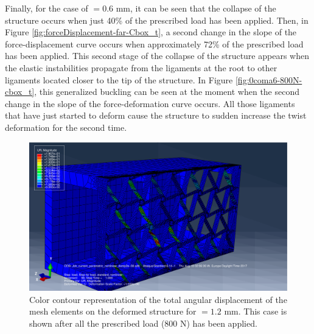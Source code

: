     Finally, for the case of \boxt$= 0.6$ mm, it can be seen that the collapse of the structure occurs when just 40\% of the prescribed load has been applied. Then, in Figure \ref{fig:forceDisplacement-far-Cbox_t}, a second change in the slope of the force-displacement curve occurs when approximately 72\% of the prescribed load has been applied. This second stage of the collapse of the structure appears when the elastic instabilities propagate from the ligaments at the root to other ligaments located closer to the tip of the structure. In Figure \ref{fig:0coma6-800N-cbox_t}, this generalized buckling can be seen at the moment when the second change in the slope of the force-deformation curve occurs. All those ligaments that have just started to deform cause the structure to sudden increase the twist deformation for the second time. 

    \begin{figure}[!htpb] %
      \centering
      \includegraphics[width=0.8 \textwidth]{../figures/result-sim/cbox/1coma4-800N}
      \caption[Color contour representation of the total angular displacement of the mesh elements on the deformed structure for \boxt$ = 1.2$ mm]{Color contour representation of the total angular displacement of the mesh elements on the deformed structure for \boxt$ = 1.2$ mm. This case is shown after all the prescribed load (800 N) has been applied.}\label{fig:1coma2-800N-cbox_t}
    \end{figure}

